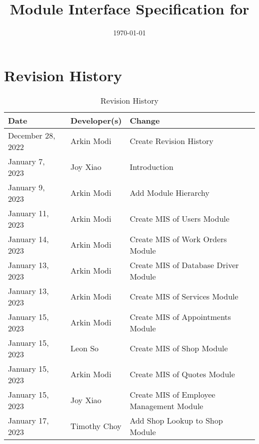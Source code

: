 \documentclass[12pt, titlepage]{article}
\begin{document}
\title{Module Interface Specification for \progname{}}

\author{\authname}

\date{\today}

\maketitle


\section{Revision History}

\begin{table}[hp]
	\caption{Revision History} \label{TblRevisionHistory}
	\begin{tabularx}{\textwidth}{llX}
		\toprule
		\textbf{Date}     & \textbf{Developer(s)} & \textbf{Change}                          \\
		\midrule
		December 28, 2022 & Arkin Modi            & Create Revision History                  \\
		January 7, 2023   & Joy Xiao              & Introduction                             \\
		January 9, 2023   & Arkin Modi            & Add Module Hierarchy                     \\
		January 11, 2023  & Arkin Modi            & Create MIS of Users Module               \\
		January 14, 2023  & Arkin Modi            & Create MIS of Work Orders Module         \\
		January 13, 2023  & Arkin Modi            & Create MIS of Database Driver Module     \\
		January 13, 2023  & Arkin Modi            & Create MIS of Services Module            \\
		January 15, 2023  & Arkin Modi            & Create MIS of Appointments Module        \\
		January 15, 2023  & Leon So               & Create MIS of Shop Module                \\
		January 15, 2023  & Arkin Modi            & Create MIS of Quotes Module              \\
		January 15, 2023  & Joy Xiao              & Create MIS of Employee Management Module \\
		January 17, 2023  & Timothy Choy          & Add Shop Lookup to Shop Module           \\

\end{tabularx}
\end{table}
\end{document}
